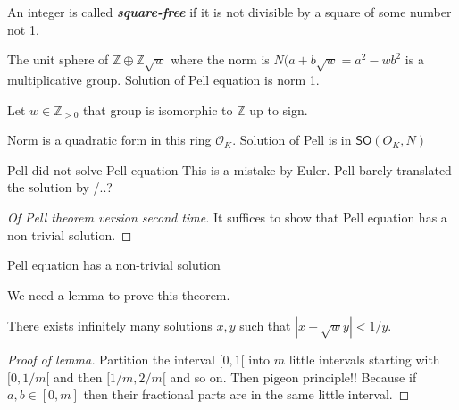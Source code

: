 \begin{defn}\leavevmode
	An integer is called \textit{\textbf{square-free}} if it is not divisible by a square of some number not 1.
\end{defn}

\begin{remark}\leavevmode
	The unit sphere of $\mathbb{Z}\oplus \mathbb{Z}\sqrt{w} $ where the norm is  $N(a+b\sqrt{w} =a^2-wb^2$ is a multiplicative group. Solution of Pell equation is norm 1.
\end{remark}

\begin{thm}\leavevmode
	Let $w\in\mathbb{Z}_{> 0}$ that group is isomorphic to $\mathbb{Z}$ {\color{3}up to sign}.
\end{thm}

 \begin{remark}\leavevmode
	 Norm is a quadratic form in this ring $\mathcal{O}_K$. Solution of Pell is in $\mathsf{SO}(O_K,N)$
\end{remark}

\begin{thing8}{Pell did not solve Pell equation}\leavevmode
	This is a mistake by Euler. Pell barely translated the solution by /..?
\end{thing8}

\begin{proof}[Of Pell theorem version second time]\leavevmode
	It suffices to show that Pell equation has a non trivial solution.
\end{proof}

\begin{thm}[Lagrange]\leavevmode
	 Pell equation has a non-trivial solution
\end{thm}
 We need a lemma to prove this theorem.

\begin{lemma}\leavevmode
	There exists infinitely many solutions $x,y$ such that  $|x-\sqrt{w} y|<1/y$.
\end{lemma}

\begin{proof}[Proof of lemma]\leavevmode
	Partition the interval $[0,1[$ into  $m$ little intervals starting with $[0,1/m[$ and then  $[1/m,2/m[$ and so on. Then pigeon principle!! Because if  $a,b\in [0,m]$ then their fractional parts are in the same little interval.
\end{proof}

